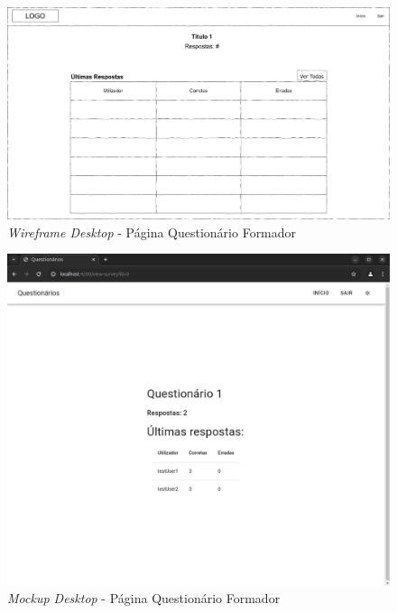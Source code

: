 \documentclass[12pt,a4paper,final]{article}
\begin{document}
    \begin{figure}[H]
        \centering
        \includegraphics[width=\textwidth,height=0.9\textheight,keepaspectratio]{wireframes/questionarios.wireframes-formador-questionario-desktop.drawio}
        \caption{\textit{Wireframe Desktop} - Página Questionário Formador}
        \label{fig:wd-pqf}
    \end{figure}

    \begin{figure}[H]
        \centering
        \includegraphics[width=\textwidth,height=0.9\textheight,keepaspectratio]{mockups/questionarios.wireframes-formador-questionario-desktop}
        \caption{\textit{Mockup Desktop} - Página Questionário Formador}
        \label{fig:md-pqf}
    \end{figure}
\end{document}
